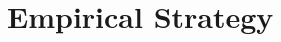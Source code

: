 \documentclass[red]{beamer}
\begin{document}


\section{Empirical Strategy}
\subsection{}

% 
% 
% 
% 
% 
\end{document}
